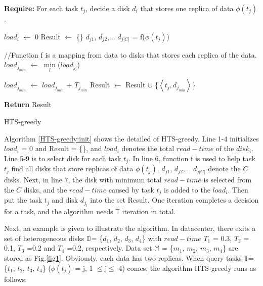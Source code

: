 \documentclass[conference]{IEEEtran}
\begin{document}
\begin{algorithm}
	
	\textbf{Require:} For each task $t_j$, decide a disk $d_i$ that stores one replica of data $\phi(t_j)$.

	\begin{algorithmic}[1]
		 \label{HTS-greedy:init}
			\State $load_{i}$ $\gets$ 0
		\EndFor
		\State Result $\gets$ \{\}
			\State $d_{j1}$, $d_{j2}$,... $d_{j|C|}$ = f($\phi(t_j)$)
		
			$//$Function f is a mapping from data to disks that stores each replica of the data.
			\State $load_{j_{min}}$ $\gets$ $\min\limits_{l}$($load_{j_l}$)
			
			$load_{j_{min}}$ $\gets$ $load_{j_{min}}$ + $T_{j_{min}}$
			\State Result $\gets$ Result $\cup$
			\{$\left \langle t_j, d_{j_{min}}\right \rangle$\}
		\EndFor
	
	\State \textbf{Return} Result
	\end{algorithmic}
	\caption{HTS-greedy}\label{HTS-greedy}
\end{algorithm}

Algorithm \ref{HTS-greedy:init} shows the detailed of HTS-greedy. Line 1-4 initializes $load_i$ = 0 and Result = \{\}, and $load_i$ denotes the total $read-time$ of the $disk_i$. Line 5-9 is to select disk for each task $t_j$. In line 6, function f is used to help task $t_j$ find all disks that store replicas of data $\phi(t_j)$. $d_{j1}$, $d_{j2}$,... $d_{j|C|}$ denote the $C$ disks.   Next, in line 7, the disk with minimum total $read-time$ is selected from the $C$ disks, and the $read-time$ caused by task $t_j$ is added to the $load_i$. Then put the task $t_j$ and disk $d_{j_l}$ into the set Result. One iteration completes a decision for a task, and the algorithm needs $\mathbb{T}$ iteration in total.

Next, an example is given to illustrate the algorithm. In datacenter, there exits a set of heterogeneous disks $\mathbb{D}$= \{$d_1$, $d_2$, $d_3$, $d_4$\} with $read-time$ $T_1$ = 0.3,  $T_2$ = 0.1,  $T_3$ =0.2 and $T_4$ =0.2, respectively. Data set $\mathbb{M}$ = \{$m_1$, $m_2$, $m_3$, $m_4$\} are stored as Fig.\ref{fig1}. Obviously, each data has two replicas. When query tasks $\mathbb{T}$= \{$t_1$, $t_2$, $t_3$, $t_4$\} ($\phi(t_j)$ = j, 1 $\leq$j$ \leq$ 4) comes, the algorithm HTS-greedy runs as follows: %
\end{document}
